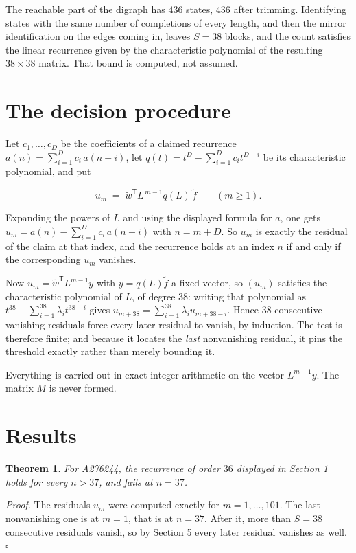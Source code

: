 \documentclass[11pt]{article}
\newtheorem{theorem}{Theorem}
\theoremstyle{definition}
\begin{document}
The reachable part of the digraph has $436$ states, $436$ after trimming. Identifying states with the same number of completions of every length, and then the mirror identification on the edges coming in, leaves $S = 38$ blocks, and the count satisfies the linear recurrence given by the characteristic polynomial of the resulting $38\times38$ matrix. That bound is computed, not assumed.

\section{The decision procedure}

Let $c_1,\dots,c_D$ be the coefficients of a claimed recurrence $a(n) = \sum_{i=1}^{D} c_i\,a(n-i)$, let $q(t) = t^{D} - \sum_{i=1}^{D} c_i t^{D-i}$ be its characteristic polynomial, and put

\[u_m \;=\; \tilde w^{\mathsf T} L^{\,m-1} q(L)\,\tilde f \qquad (m \ge 1).\]

Expanding the powers of $L$ and using the displayed formula for $a$, one gets $u_m = a(n) - \sum_{i=1}^{D} c_i\,a(n-i)$ with $n = m + D$. So $u_m$ is exactly the residual of the claim at that index, and the recurrence holds at an index $n$ if and only if the corresponding $u_m$ vanishes.

Now $u_m = \tilde w^{\mathsf T} L^{m-1} y$ with $y = q(L)\tilde f$ a fixed vector, so $(u_m)$ satisfies the characteristic polynomial of $L$, of degree $38$: writing that polynomial as $t^{38} - \sum_{i=1}^{38} \lambda_i t^{38-i}$ gives $u_{m+38} = \sum_{i=1}^{38} \lambda_i u_{m+38-i}$. Hence $38$ consecutive vanishing residuals force every later residual to vanish, by induction. The test is therefore finite; and because it locates the {\itshape last} nonvanishing residual, it pins the threshold exactly rather than merely bounding it.

Everything is carried out in exact integer arithmetic on the vector $L^{m-1}y$. The matrix $M$ is never formed.

\section{Results}

\begin{theorem} For A276244, the recurrence of order $36$ displayed in Section 1 holds for every $n > 37$, and fails at $n = 37$.\end{theorem}

{\itshape Proof.} The residuals $u_m$ were computed exactly for $m = 1,\dots,101$. The last nonvanishing one is at $m = 1$, that is at $n = 37$. After it, more than $S = 38$ consecutive residuals vanish, so by Section 5 every later residual vanishes as well. $\square$
\end{document}
